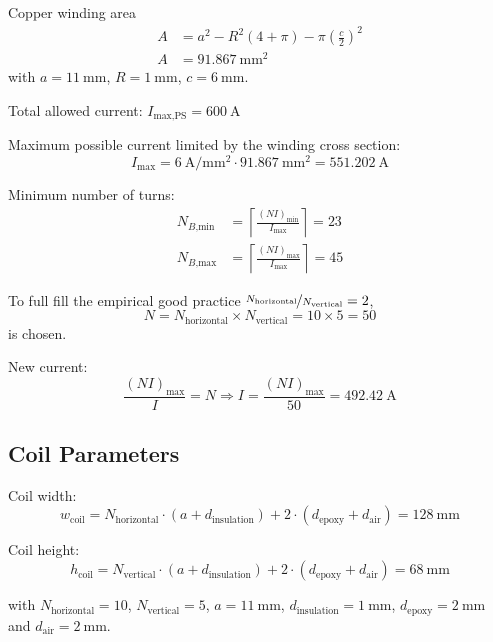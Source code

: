 \documentclass[10pt,a4paper,noendnumber=true]{scrartcl}
\begin{document}
Copper winding area
\begin{align}
A &= a^2- R^2 (4+\pi) - \pi \left(\frac{c}{2}\right)^2\\
A &= \SI{91.867}{\mm\squared}
\end{align}
with $a=\SI{11}{\mm}$, $R=\SI{1}{\mm}$, $c=\SI{6}{\mm}$.

Total allowed current: $I_\text{max,PS} = \SI{600}{\ampere}$

Maximum possible current limited by the winding cross section:
\begin{equation}
I_\text{max} = \SI{6}{\ampere\per\mm\squared} \cdot \SI{91.867}{\mm\squared} = \SI{551.202}{\ampere}
\end{equation}

Minimum number of turns:
\begin{align}
    N_{B\text{,min}} &= \left\lceil\frac{(NI)_\text{min}}{I_\text{max}}\right\rceil = 23\\
    N_{B\text{,max}} &= \left\lceil\frac{(NI)_\text{max}}{I_\text{max}}\right\rceil = 45
\end{align}

To full fill the empirical good practice $\nicefrac{N_\text{horizontal}}{N_\text{vertical}}=2$,
\begin{equation}
    N=N_\text{horizontal} \times N_\text{vertical} = 10 \times 5 = 50
\end{equation}
is chosen.

New current:
\begin{equation}
    \frac{(NI)_\text{max}}{I} = N \Rightarrow I = \frac{(NI)_\text{max}}{50} = \SI{492.42}{\ampere}
\end{equation}

\subsection{Coil Parameters}
Coil width:
\begin{equation}
    w_\text{coil}=N_\text{horizontal} \cdot (a+d_\text{insulation}) + 2\cdot(d_\text{epoxy} + d_\text{air}) = \SI{128}{\mm}
\end{equation}

Coil height:
\begin{equation}
    h_\text{coil}=N_\text{vertical} \cdot (a+d_\text{insulation}) + 2\cdot(d_\text{epoxy} + d_\text{air}) = \SI{68}{\mm}
\end{equation}

with $N_\text{horizontal}=10$, $N_\text{vertical}=5$, $a=\SI{11}{\mm}$, $d_\text{insulation}=\SI{1}{\mm}$, $d_\text{epoxy}=\SI{2}{\mm}$ and $d_\text{air}=\SI{2}{\mm}$.
\end{document}
